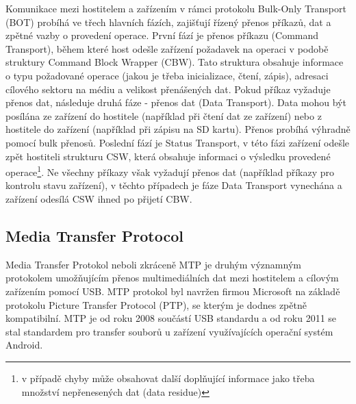 Komunikace mezi hostitelem a zařízením v rámci protokolu Bulk-Only Transport (BOT) probíhá ve třech hlavních fázích, zajišťují řízený přenos příkazů, dat a zpětné vazby o provedení operace. První fází je přenos příkazu (Command Transport), během které host odešle zařízení požadavek na operaci v podobě struktury Command Block Wrapper (CBW). Tato struktura obsahuje informace o typu požadované operace (jakou je třeba inicializace, čtení, zápis), adresaci cílového sektoru na médiu a velikost přenášených dat. Pokud příkaz vyžaduje přenos dat, následuje druhá fáze - přenos dat (Data Transport). Data mohou být posílána ze zařízení do hostitele (například při čtení dat ze zařízení) nebo z hostitele do zařízení (například při zápisu na SD kartu). Přenos probíhá výhradně pomocí bulk přenosů. Poslední fází je Status Transport, v této fázi zařízení odešle zpět hostiteli strukturu CSW, která obsahuje informaci o výsledku provedené operace\footnote{v případě chyby může obsahovat další doplňující informace jako třeba množství nepřenesených dat (data residue)}. Ne všechny příkazy však vyžadují přenos dat (například příkazy pro kontrolu stavu zařízení), v těchto případech je fáze Data Transport vynechána a zařízení odesílá CSW ihned po přijetí CBW. \cite{silicon_labs_mass_storage_protocol}



\subsection{Media Transfer Protocol}
Media Transfer Protokol neboli zkráceně MTP je druhým významným protokolem umožňujícím přenos multimediálních dat mezi hostitelem a cílovým zařízením pomocí USB. MTP protokol byl navržen firmou Microsoft na základě protokolu Picture Transfer Protocol (PTP), se kterým je dodnes zpětně kompatibilní. MTP je od roku 2008 součástí USB standardu a od roku 2011 se stal standardem pro transfer souborů u zařízení využívajících operační systém Android. 

